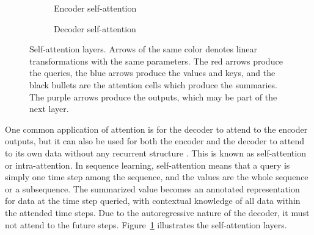 \documentclass[11pt]{article}
\begin{document}
\begin{figure}
\begin{subfigure}{0.5\textwidth}
\centering
{}
\caption*{Encoder self-attention}
\end{subfigure}%
\begin{subfigure}{0.5\textwidth}
\centering
{}
\caption*{Decoder self-attention}
\end{subfigure}
\caption[]{\label{fig:layer}Self-attention layers.
Arrows of the same color denotes linear transformations with the same parameters.
The red arrows produce the queries,
the blue arrows produce the values and keys,
and the black bullets are the attention cells
which produce the summaries.
The purple arrows produce the outputs,
which may be part of the next layer.}
\end{figure}

One common application of attention is for the decoder to attend to the encoder outputs,
but it can also be used for both the encoder and the decoder to attend to its own data
without any recurrent structure \parencite{parikh2016decomposable}.
This is known as self-attention or intra-attention.
In sequence learning, self-attention means that a query is simply one time step among the sequence,
and the values are the whole sequence or a subsequence.
The summarized value becomes an annotated representation for data at the time step queried,
with contextual knowledge of all data within the attended time steps.
Due to the autoregressive nature of the decoder,
it must not attend to the future steps.
Figure~\ref{fig:layer} illustrates the self-attention layers.
\end{document}
